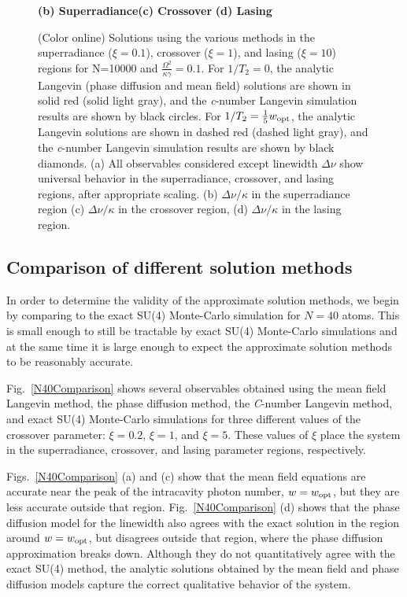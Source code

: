 \documentclass[aps,
twocolumn,
showpacs,
superscriptaddress,groupedaddress]{revtex4}
\begin{document}
\begin{figure}
\begin{center}
	\hspace{-10mm}\textbf{(b) Superradiance}\hspace{33mm}\textbf{(c) Crossover}
  \hspace{37mm}\textbf{(d) Lasing}
\end{center}
		\vspace{-5mm}
\caption{(Color online) Solutions using the various methods in the
superradiance ($\xi=0.1$), crossover ($\xi=1$), and lasing ($\xi=10$)
regions for N=10000 and $\frac{\Omega^2}{\kappa \gamma}=0.1$. For
$1/T_2=0$, the analytic Langevin (phase diffusion and mean field)
solutions are shown in solid red (solid light gray), and the
{\it c}-number Langevin simulation results are shown by black circles.
For $1/T_2=\frac{1}{5} w_{\rm opt}$, the analytic Langevin solutions are
shown in dashed red (dashed light gray), and the {\it
c}-number Langevin simulation results are shown by black diamonds. (a)
All observables considered except linewidth  $\Delta \nu$ show universal
behavior in the superradiance, crossover, and lasing regions, after
appropriate scaling.  (b)  $\Delta \nu / \kappa$ in the superradiance
region (c) $\Delta \nu / \kappa$ in the crossover region, (d) $\Delta
\nu / \kappa$ in the lasing region.}
 \label{N10000Comparison}
\end{figure}


\subsection{Comparison of different solution methods}

In order to determine the validity of the approximate solution
methods, we begin by comparing to the exact SU(4) Monte-Carlo
simulation for $N=40$ atoms. This is small enough to still be
tractable by exact SU(4) Monte-Carlo simulations and at the same time
it is large enough to expect the approximate solution methods to be
reasonably accurate.

Fig.~\ref{N40Comparison} shows several observables obtained using the
mean field Langevin method, the phase diffusion method, the {\it
  C}-number Langevin method, and exact SU(4) Monte-Carlo simulations
for three different values of the crossover parameter: $\xi=0.2$,
$\xi=1$, and $\xi=5$. These values of $\xi$ place the system in the
superradiance, crossover, and lasing parameter regions, respectively.


Figs.~\ref{N40Comparison} (a) and (c) show that the mean field
equations are accurate near the peak of the intracavity photon number,
$w=w_{\rm opt}$, but they are less accurate outside that region.
Fig.~\ref{N40Comparison} (d) shows that the phase diffusion model for
the linewidth also agrees with the exact solution in the region around
$w=w_{\rm opt}$, but disagrees outside that region, where the phase
diffusion approximation breaks down.  Although they do not
quantitatively agree with the exact SU(4) method, the analytic
solutions obtained by the mean field and phase diffusion models
capture the correct qualitative behavior of the system.
\end{document}
